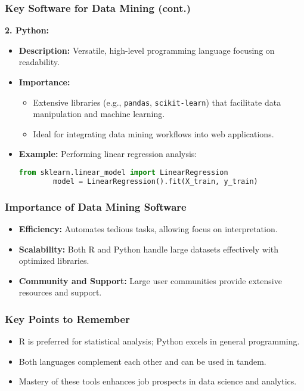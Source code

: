 \documentclass[aspectratio=169]{beamer}
\begin{document}
\begin{frame}[fragile]
    \frametitle{Key Software for Data Mining (cont.)}
    \textbf{2. Python:}
    \begin{itemize}
        \item \textbf{Description:} Versatile, high-level programming language focusing on readability.
        \item \textbf{Importance:}
        \begin{itemize}
            \item Extensive libraries (e.g., \texttt{pandas}, \texttt{scikit-learn}) that facilitate data manipulation and machine learning.
            \item Ideal for integrating data mining workflows into web applications.
        \end{itemize}
        \item \textbf{Example:} Performing linear regression analysis:
        \begin{lstlisting}[language=Python]
        from sklearn.linear_model import LinearRegression
        model = LinearRegression().fit(X_train, y_train)
        \end{lstlisting}
    \end{itemize}
\end{frame}

\begin{frame}[fragile]
    \frametitle{Importance of Data Mining Software}
    \begin{itemize}
        \item \textbf{Efficiency:} Automates tedious tasks, allowing focus on interpretation.
        \item \textbf{Scalability:} Both R and Python handle large datasets effectively with optimized libraries.
        \item \textbf{Community and Support:} Large user communities provide extensive resources and support.
    \end{itemize}
\end{frame}

\begin{frame}[fragile]
    \frametitle{Key Points to Remember}
    \begin{itemize}
        \item R is preferred for statistical analysis; Python excels in general programming.
        \item Both languages complement each other and can be used in tandem.
        \item Mastery of these tools enhances job prospects in data science and analytics.
    \end{itemize}
\end{frame}
\end{document}
